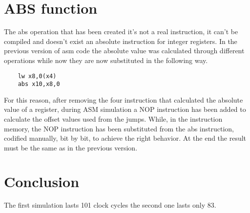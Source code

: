 \section{ABS function}

The abs operation that has been created it's not a real instruction, it can't be compiled and doesn't exist
an absolute instruction for integer registers. In the previous version of asm code the absolute value was calculated 
through different operations while now they are now substituted in the following way.

\begin{lstlisting}
    lw x8,0(x4)      
    abs x10,x8,0
\end{lstlisting}

For this reason, after removing the four instruction that calculated
the absolute value of a register, during ASM simulation a NOP instruction has been added to calculate the
offset values used from the jumps. While, in the instruction memory, the NOP instruction has been substituted from 
the abs instruction, codified manually, bit by bit, to achieve the right behavior.
At the end the result must be the same as in the previous version.


\section{Conclusion}

The first simulation lasts 101 clock cycles the second one lasts only 83.